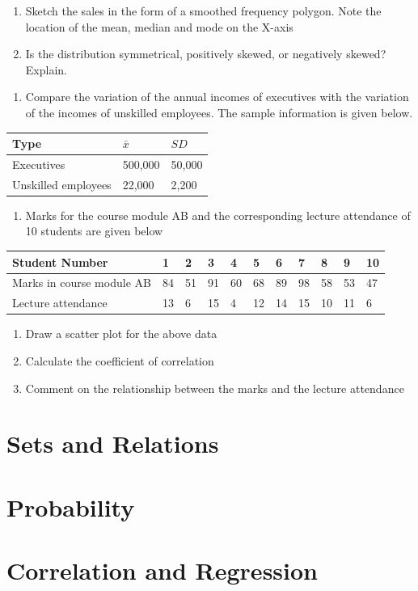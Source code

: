 \documentclass[]{book}
\providecommand{\tightlist}{%
  \setlength{\itemsep}{0pt}\setlength{\parskip}{0pt}}
\begin{document}
\begin{enumerate}
\def\labelenumi{(\alph{enumi})}
\tightlist
\item
  Sketch the sales in the form of a smoothed frequency polygon. Note the location of the mean, median and mode on the X-axis
\item
  Is the distribution symmetrical, positively skewed, or negatively skewed? Explain.
\end{enumerate}

\begin{enumerate}
\def\labelenumi{\arabic{enumi}.}
\setcounter{enumi}{14}
\tightlist
\item
  Compare the variation of the annual incomes of executives with the variation of the incomes of unskilled employees. The sample information is given below.
\end{enumerate}

\begin{longtable}[]{@{}lll@{}}
\toprule
Type & \(\bar{x}\) & \(SD\)\tabularnewline
\midrule
\endhead
Executives & 500,000 & 50,000\tabularnewline
Unskilled employees & 22,000 & 2,200\tabularnewline
\bottomrule
\end{longtable}

\begin{enumerate}
\def\labelenumi{\arabic{enumi}.}
\setcounter{enumi}{15}
\tightlist
\item
  Marks for the course module AB and the corresponding lecture attendance of 10 students are given below
\end{enumerate}

\begin{longtable}[]{@{}lllllllllll@{}}
\toprule
Student Number & 1 & 2 & 3 & 4 & 5 & 6 & 7 & 8 & 9 & 10\tabularnewline
\midrule
\endhead
Marks in course module AB & 84 & 51 & 91 & 60 & 68 & 89 & 98 & 58 & 53 & 47\tabularnewline
Lecture attendance & 13 & 6 & 15 & 4 & 12 & 14 & 15 & 10 & 11 & 6\tabularnewline
\bottomrule
\end{longtable}

\begin{enumerate}
\def\labelenumi{(\alph{enumi})}
\tightlist
\item
  Draw a scatter plot for the above data
\item
  Calculate the coefficient of correlation
\item
  Comment on the relationship between the marks and the lecture attendance
\end{enumerate}

\hypertarget{sets-and-relations}{%
\chapter{Sets and Relations}\label{sets-and-relations}}

\hypertarget{probability}{%
\chapter{Probability}\label{probability}}

\hypertarget{correlation-and-regression}{%
\chapter{Correlation and Regression}\label{correlation-and-regression}}


\end{document}
